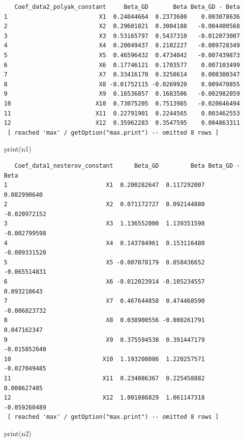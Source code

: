 \documentclass[
  letterpaper,
  DIV=11,
  numbers=noendperiod]{scrartcl}
\newenvironment{Shaded}{\begin{snugshade}}{\end{snugshade}}
\newcommand{\FunctionTok}[1]{\textcolor[rgb]{0.28,0.35,0.67}{#1}}
\newcommand{\NormalTok}[1]{\textcolor[rgb]{0.00,0.23,0.31}{#1}}
\begin{document}
\begin{verbatim}
   Coef_data2_polyak_constant     Beta_GD       Beta Beta_GD - Beta
1                          X1  0.24044664  0.2373680    0.003078636
2                          X2  0.29601821  0.3004188   -0.004400568
3                          X3  0.53165797  0.5437310   -0.012073007
4                          X4  0.20049437  0.2102227   -0.009728349
5                          X5  0.46596432  0.4734042   -0.007439873
6                          X6  0.17746121  0.1703577    0.007103499
7                          X7  0.33416170  0.3258614    0.008300347
8                          X8 -0.01752115 -0.0269920    0.009470855
9                          X9  0.16536857  0.1683506   -0.002982059
10                        X10  0.73075205  0.7513985   -0.020646494
11                        X11  0.22791901  0.2244565    0.003462553
12                        X12  0.35962283  0.3547595    0.004863311
 [ reached 'max' / getOption("max.print") -- omitted 8 rows ]
\end{verbatim}

\begin{Shaded}
\begin{Highlighting}[]
\FunctionTok{print}\NormalTok{(n1)}
\end{Highlighting}
\end{Shaded}

\begin{verbatim}
   Coef_data1_nesterov_constant      Beta_GD         Beta Beta_GD - Beta
1                            X1  0.200282647  0.117292007    0.082990640
2                            X2  0.071172727  0.092144880   -0.020972152
3                            X3  1.136552000  1.139351598   -0.002799598
4                            X4  0.143784961  0.153116480   -0.009331520
5                            X5 -0.007078179  0.058436652   -0.065514831
6                            X6 -0.012023914 -0.105234557    0.093210643
7                            X7  0.467644858  0.474468590   -0.006823732
8                            X8  0.038900556 -0.008261791    0.047162347
9                            X9  0.375594538  0.391447179   -0.015852640
10                          X10  1.193208086  1.220257571   -0.027049485
11                          X11  0.234086367  0.225458882    0.008627485
12                          X12  1.001886829  1.061147318   -0.059260489
 [ reached 'max' / getOption("max.print") -- omitted 8 rows ]
\end{verbatim}

\begin{Shaded}
\begin{Highlighting}[]
\FunctionTok{print}\NormalTok{(n2)}
\end{Highlighting}
\end{Shaded}
\end{document}
